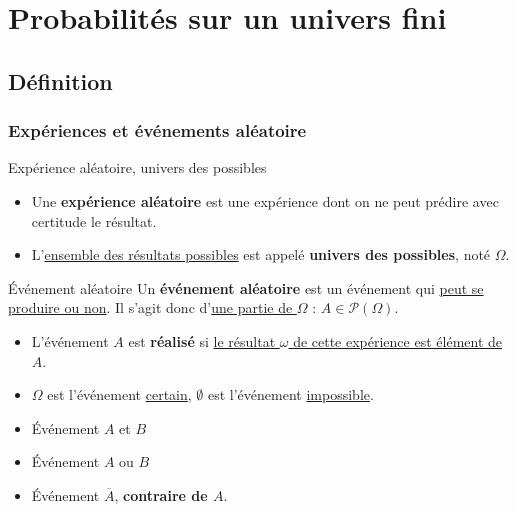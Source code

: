 \chapter{Probabilités sur un univers fini} %

\section{Définition} %
\label{sec:Définition}

\subsection{Expériences et événements aléatoire} %
\begin{Definition}[colbacktitle=red!75!black]{Expérience aléatoire, univers des possibles}{}
  \begin{itemize}

      \item 
Une \textbf{expérience aléatoire} est une expérience dont on ne peut prédire avec certitude le résultat. 

\item L'\underline{ensemble des résultats possibles} est appelé \textbf{univers des possibles}, noté $\Omega$.

  \end{itemize}
\end{Definition}

\begin{Definition}[colbacktitle=red!75!black]{
    Événement aléatoire
  }{}
Un \textbf{événement aléatoire} est un événement qui \underline{peut se produire ou non}. Il s'agit donc d'\underline{une partie de $\Omega$} : $A \in \mathscr{P}(\Omega)$.

\begin{itemize}

    \item 
L'événement $A$ est \textbf{réalisé} si \underline{le résultat $\omega$ de cette expérience est élément de $A$}.

\item $\Omega$ est l'événement \underline{certain}, $\emptyset$ est l'événement \underline{impossible}.

\end{itemize}
\end{Definition}


\begin{Definition}[colbacktitle=red!75!black]{}{}
\begin{itemize}

    \item Événement $A$ et $B$ 
    \item Événement $A$ ou $B$
    \item Événement $\overline{A}$, \textbf{contraire de $A$}.

\end{itemize}
\end{Definition}


